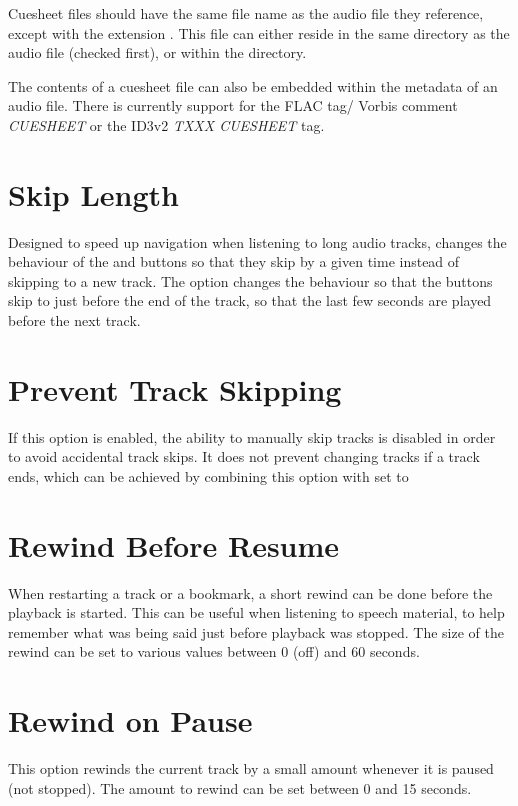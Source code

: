   Cuesheet files should have the same file name as the audio file they
  reference, except with the extension . This file can either
  reside in the same directory as the audio file (checked first), or within the
   directory.
  
  The contents of a cuesheet file can also be embedded within the metadata of
  an audio file. There is currently support for the FLAC tag/ Vorbis comment
  \emph{CUESHEET} or the ID3v2 \emph{TXXX CUESHEET} tag.
  
\section{Skip Length}
  Designed to speed up navigation when listening to long audio tracks,
   changes the behaviour of
  the \ActionWpsSkipPrev{} and \ActionWpsSkipNext{} buttons so that they skip
  by a given time instead of skipping to a new track.
  The  option changes the behaviour so that the buttons
  skip to just before the end of the track, so that the last few seconds are
  played before the next track.

\section{Prevent Track Skipping}
  If this option is enabled, the ability to manually skip tracks is disabled
  in order to avoid accidental track skips. It does not prevent changing tracks
  if a track ends, which can be achieved by combining this option with
   set to 

\section{Rewind Before Resume}
  When restarting a track or a bookmark, a short rewind can be done before the
  playback is started. This can be useful when listening to speech material,
  to help remember what was being said just before playback was stopped.
  The size of the rewind can be set to various values between 0 (off) and
  60 seconds.

\section{Rewind on Pause}
  This option rewinds the current track by a small amount whenever it is
  paused (not stopped).  The amount to rewind can be set between 0 and
  15 seconds.

